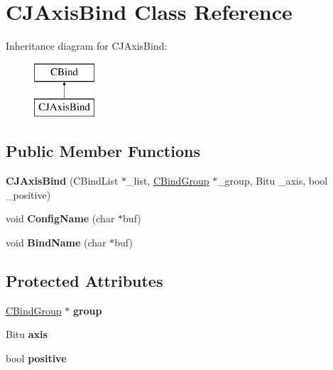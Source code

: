 \hypertarget{classCJAxisBind}{\section{C\-J\-Axis\-Bind Class Reference}
\label{classCJAxisBind}
}
Inheritance diagram for C\-J\-Axis\-Bind\-:\begin{figure}[H]
\begin{center}
\leavevmode
\includegraphics[height=2.000000cm]{classCJAxisBind}
\end{center}
\end{figure}
\subsection*{Public Member Functions}
\begin{DoxyCompactItemize}
\item 
\hypertarget{classCJAxisBind_aebf1190a6d2e50ab976a61083be5e85b}{{\bfseries C\-J\-Axis\-Bind} (C\-Bind\-List $\ast$\-\_\-list, \hyperlink{classCBindGroup}{C\-Bind\-Group} $\ast$\-\_\-group, Bitu \-\_\-axis, bool \-\_\-positive)}\label{classCJAxisBind_aebf1190a6d2e50ab976a61083be5e85b}

\item 
\hypertarget{classCJAxisBind_a177d6d9c27c002c88b1a05cd3d31d065}{void {\bfseries Config\-Name} (char $\ast$buf)}\label{classCJAxisBind_a177d6d9c27c002c88b1a05cd3d31d065}

\item 
\hypertarget{classCJAxisBind_aec1508a8f00bb7b5f4aa5a42c33fe973}{void {\bfseries Bind\-Name} (char $\ast$buf)}\label{classCJAxisBind_aec1508a8f00bb7b5f4aa5a42c33fe973}

\end{DoxyCompactItemize}
\subsection*{Protected Attributes}
\begin{DoxyCompactItemize}
\item 
\hypertarget{classCJAxisBind_a3aeea9f221c5a76fdf0658d5df006cac}{\hyperlink{classCBindGroup}{C\-Bind\-Group} $\ast$ {\bfseries group}}\label{classCJAxisBind_a3aeea9f221c5a76fdf0658d5df006cac}

\item 
\hypertarget{classCJAxisBind_a1845e3060cbcb2180e5a907dda6a7d4c}{Bitu {\bfseries axis}}\label{classCJAxisBind_a1845e3060cbcb2180e5a907dda6a7d4c}

\item 
\hypertarget{classCJAxisBind_a5c25cb696106b0959274368cd8dae0bd}{bool {\bfseries positive}}\label{classCJAxisBind_a5c25cb696106b0959274368cd8dae0bd}

\end{DoxyCompactItemize}


